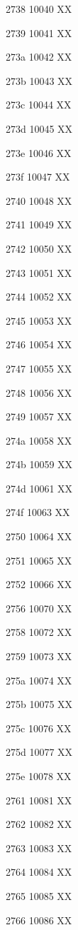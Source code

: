 \documentclass[11pt]{article}
\begin{document}
2738 10040 X{}X

2739 10041 X{}X

273a 10042 X{}X

273b 10043 X{}X

273c 10044 X{}X

273d 10045 X{}X

273e 10046 X{}X

273f 10047 X{}X

2740 10048 X{}X

2741 10049 X{}X

2742 10050 X{}X

2743 10051 X{}X

2744 10052 X{}X

2745 10053 X{}X

2746 10054 X{}X

2747 10055 X{}X

2748 10056 X{}X

2749 10057 X{}X

274a 10058 X{}X

274b 10059 X{}X

274d 10061 X{}X

274f 10063 X{}X

2750 10064 X{}X

2751 10065 X{}X

2752 10066 X{}X

2756 10070 X{}X

2758 10072 X{}X

2759 10073 X{}X

275a 10074 X{}X

275b 10075 X{}X

275c 10076 X{}X

275d 10077 X{}X

275e 10078 X{}X

2761 10081 X{}X

2762 10082 X{}X

2763 10083 X{}X

2764 10084 X{}X

2765 10085 X{}X

2766 10086 X{}X
\end{document}

